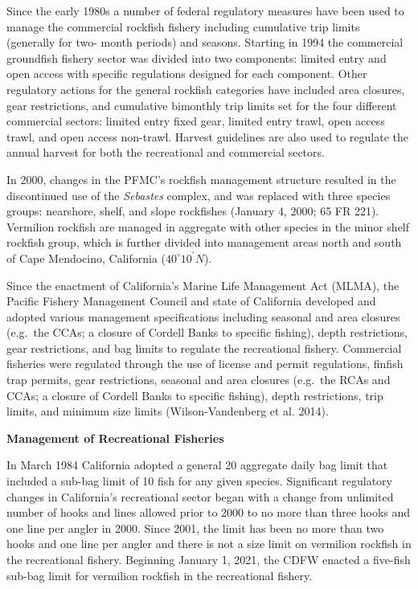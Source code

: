 \documentclass[
  english,
  a4paper,
]{article}
\begin{document}
Since the early 1980s a number of federal regulatory measures have been used to
manage the commercial rockfish fishery including cumulative trip limits (generally
for two- month periods) and seasons. Starting in 1994 the commercial groundfish
fishery sector was divided into two components: limited entry and open access
with specific regulations designed for each component. Other regulatory actions
for the general rockfish categories have included area closures, gear restrictions,
and cumulative bimonthly trip limits set for the four different commercial sectors:
limited entry fixed gear, limited entry trawl, open access trawl, and open access non-trawl.
Harvest guidelines are also used to regulate the annual harvest for both the recreational and
commercial sectors.

In 2000, changes in the PFMC's rockfish management structure resulted in the
discontinued use of the \emph{Sebastes} complex, and was replaced with three species
groups: nearshore, shelf, and slope rockfishes (January 4, 2000; 65 FR 221).
Vermilion rockfish are managed in aggregate with other species in the minor shelf
rockfish group, which is further divided into management areas north and south of
Cape Mendocino, California ($40^\circ 10^\prime N$).

Since the enactment of California's Marine Life Management Act (MLMA), the
Pacific Fishery Management Council and state of California developed and adopted
various management specifications including seasonal and area closures (e.g.~the CCAs;
a closure of Cordell Banks to specific fishing), depth restrictions, gear restrictions,
and bag limits to regulate the recreational fishery. Commercial fisheries were
regulated through the use of license
and permit regulations, finfish trap permits, gear restrictions, seasonal
and area closures (e.g.~the RCAs and CCAs; a closure of Cordell Banks to
specific fishing), depth restrictions, trip limits, and minimum size
limits (Wilson-Vandenberg et al. 2014).

\textbf{Management of Recreational Fisheries}

In March 1984 California adopted a general 20 aggregate daily bag limit that
included a sub-bag limit of 10 fish for any given species. Significant regulatory
changes in California's recreational sector began with a change
from unlimited number of hooks and lines allowed prior to 2000 to no more than
three hooks and one line per angler in 2000. Since 2001, the limit has been no
more than two hooks and one line per angler and there is not a size limit on vermilion
rockfish in the recreational fishery. Beginning January 1, 2021, the CDFW enacted a
five-fish sub-bag limit for vermilion rockfish in the recreational fishery.
\end{document}
